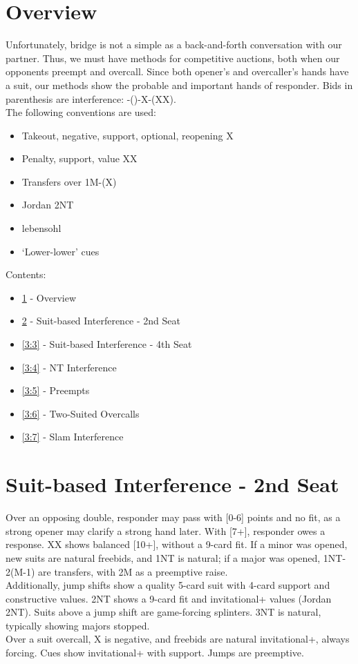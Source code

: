 \documentclass[12pt]{report}
\newcommand{\n}{\\}
\newcommand{\ul}[1]{\begin{itemize}#1\end{itemize}}
\newcommand{\li}{\item[~]}
\begin{document}
\section{Overview} \label{3:1}

Unfortunately, bridge is not a simple as a back-and-forth conversation with our partner.  Thus, we must have methods for competitive auctions, both when our opponents preempt and overcall.  Since both opener's and overcaller's hands have a suit, our methods show the probable and important hands of responder.  Bids in parenthesis are interference: -()-X-(XX). \n

The following conventions are used:
\begin{itemize} \itemsep0em
    \item Takeout, negative, support, optional, reopening X
    \item Penalty, support, value XX
    \item Transfers over 1M-(X)
    \item Jordan 2NT
    \item lebensohl
    \item `Lower-lower' cues
\end{itemize}
Contents:
\ul {
    \li \ref{3:1} - Overview
    \li \ref{3:2} - Suit-based Interference - 2nd Seat
    \li \ref{3:3} - Suit-based Interference - 4th Seat
    \li \ref{3:4} - NT Interference
    \li \ref{3:5} - Preempts
    \li \ref{3:6} - Two-Suited Overcalls
    \li \ref{3:7} - Slam Interference
}
\newpage

\section{Suit-based Interference - 2nd Seat} \label{3:2}
    
    Over an opposing double, responder may pass with [0-6] points and no fit, as a strong opener may clarify a strong hand later.  With [7+], responder owes a response.  XX shows balanced [10+], without a 9-card fit.  If a minor was opened, new suits are natural freebids, and 1NT is natural; if a major was opened, 1NT-2(M-1) are transfers, with 2M as a preemptive raise.\n

    Additionally, jump shifts show a quality 5-card suit with 4-card support and constructive values.  2NT shows a 9-card fit and invitational+ values (Jordan 2NT).  Suits above a jump shift are game-forcing splinters.  3NT is natural, typically showing majors stopped. \n

    Over a suit overcall, X is negative, and freebids are natural invitational+, always forcing.  Cues show invitational+ with support.  Jumps are preemptive.\n
\end{document}

